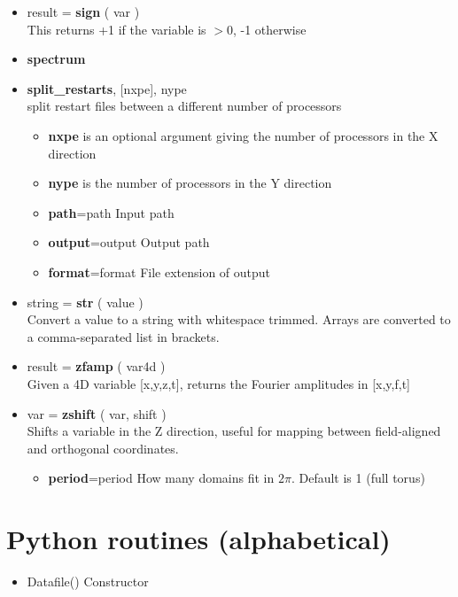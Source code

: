 \documentclass[12pt]{article}
\begin{document}
\begin{itemize}
\item result = {\bf sign} ( var ) \\
  This returns +1 if the variable is $> 0$, -1 otherwise
\item {\bf spectrum}
\item {\bf split\_restarts}, [nxpe], nype \\
  split restart files between a different number of processors
  \begin{itemize}
  \item {\bf nxpe} is an optional argument giving the number of
    processors in the X direction
  \item {\bf nype} is the number of processors in the Y direction
  \item {\bf path}=path      Input path
  \item {\bf output}=output  Output path
  \item {\bf format}=format  File extension of output
  \end{itemize}
\item string = {\bf str} ( value ) \\
  Convert a value to a string with whitespace trimmed. Arrays are
  converted to a comma-separated list in brackets.
\item result = {\bf zfamp} ( var4d )\\
  Given a 4D variable [x,y,z,t], returns the Fourier amplitudes in [x,y,f,t]
\item var = {\bf zshift} ( var, shift ) \\
  Shifts a variable in the Z direction, useful for mapping between field-aligned and orthogonal
  coordinates. 
  \begin{itemize}
  \item {\bf period}=period  How many domains fit in $2\pi$. Default is 1 (full torus)
  \end{itemize}
\end{itemize}

\section{Python routines (alphabetical)}
\label{apx:py_routines}

\begin{itemize}
\item Datafile()  Constructor
\end{itemize}

\printindex
\end{document}
